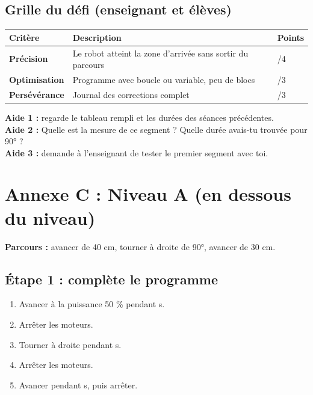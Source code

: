 \documentclass[11pt,a4paper]{article}
\begin{document}
\subsection*{Grille du défi (enseignant et élèves)}
\begin{tabularx}{\linewidth}{>{\bfseries}p{3.6cm}Y p{2.4cm}}
\toprule
Critère & Description & Points\\
\midrule
Précision & Le robot atteint la zone d'arrivée sans sortir du parcours & /4\\
Optimisation & Programme avec boucle ou variable, peu de blocs & /3\\
Persévérance & Journal des corrections complet & /3\\
\bottomrule
\end{tabularx}

\begin{tcolorbox}[colback=yellow!10,colframe=yellow!50!black,title={Cartes d'aide à utiliser dans l'ordre},fonttitle=\bfseries\small]
\textbf{Aide 1 :} regarde le tableau rempli et les durées des séances précédentes.\\
\textbf{Aide 2 :} Quelle est la mesure de ce segment ? Quelle durée avais-tu trouvée pour 90° ?\\
\textbf{Aide 3 :} demande à l'enseignant de tester le premier segment avec toi.
\end{tcolorbox}

\newpage
\section*{Annexe C : Niveau A (en dessous du niveau)}

\textbf{Parcours :} avancer de 40 cm, tourner à droite de 90°, avancer de 30 cm.

\subsection*{Étape 1 : complète le programme}
\begin{enumerate}
 \item Avancer à la puissance 50 \% pendant \dotfill{} s.
 \item Arrêter les moteurs.
 \item Tourner à droite pendant \dotfill{} s.
 \item Arrêter les moteurs.
 \item Avancer pendant \dotfill{} s, puis arrêter.
\end{enumerate}
\end{document}
